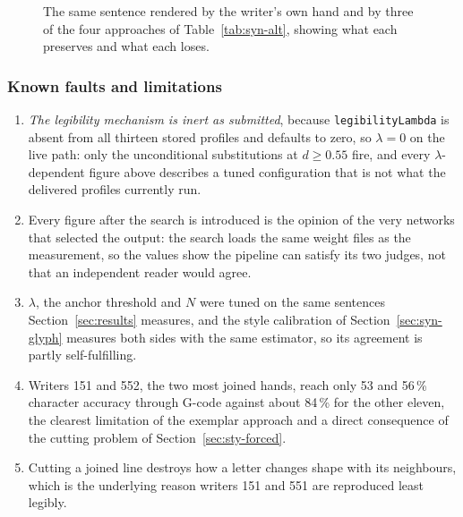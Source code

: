 \begin{figure}[htb]
\centering
{}
\caption{The same sentence rendered by the writer's own hand and by three of the four approaches of Table~\ref{tab:syn-alt}, showing what each preserves and what each loses.}
\label{fig:syn-alt-comparison}
\end{figure}

\subsubsection{Known faults and limitations}
\label{sec:syn-limits}

\begin{enumerate}\setlength{\itemsep}{0pt}\setlength{\parskip}{0pt}
\item \emph{The legibility mechanism is inert as submitted}, because \texttt{legibilityLambda} is absent from all thirteen stored profiles and defaults to zero, so $\lambda=0$ on the live path: only the unconditional substitutions at $d\ge0.55$ fire, and every $\lambda$-dependent figure above describes a tuned configuration that is not what the delivered profiles currently run.
\item Every figure after the search is introduced is the opinion of the very networks that selected the output: the search loads the same weight files as the measurement, so the values show the pipeline can satisfy its two judges, not that an independent reader would agree.
\item $\lambda$, the anchor threshold and $N$ were tuned on the same sentences Section~\ref{sec:results} measures, and the style calibration of Section~\ref{sec:syn-glyph} measures both sides with the same estimator, so its agreement is partly self-fulfilling.
\item Writers 151 and 552, the two most joined hands, reach only 53 and 56\,\% character accuracy through G-code against about 84\,\% for the other eleven, the clearest limitation of the exemplar approach and a direct consequence of the cutting problem of Section~\ref{sec:sty-forced}.
\item Cutting a joined line destroys how a letter changes shape with its neighbours, which is the underlying reason writers 151 and 551 are reproduced least legibly.
\end{enumerate}

